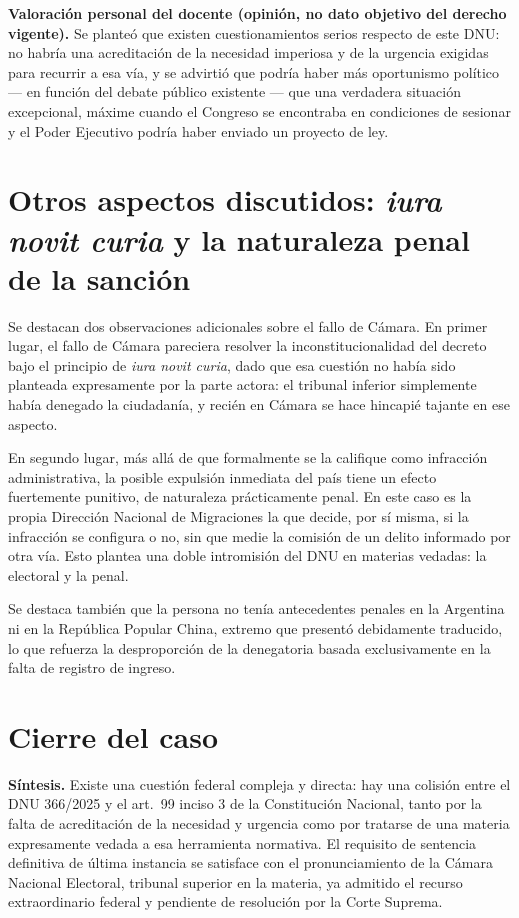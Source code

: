 \documentclass[12pt,oneside]{book}
\begin{document}
\begin{note}
\textbf{Valoración personal del docente (opinión, no dato objetivo del derecho vigente).} Se planteó que existen cuestionamientos serios respecto de este DNU: no habría una acreditación de la necesidad imperiosa y de la urgencia exigidas para recurrir a esa vía, y se advirtió que podría haber más oportunismo político --- en función del debate público existente --- que una verdadera situación excepcional, máxime cuando el Congreso se encontraba en condiciones de sesionar y el Poder Ejecutivo podría haber enviado un proyecto de ley.
\end{note}

\section{Otros aspectos discutidos: \textit{iura novit curia} y la naturaleza penal de la sanción}

Se destacan dos observaciones adicionales sobre el fallo de Cámara. En primer lugar, el fallo de Cámara pareciera resolver la inconstitucionalidad del decreto bajo el principio de \textit{iura novit curia}, dado que esa cuestión no había sido planteada expresamente por la parte actora: el tribunal inferior simplemente había denegado la ciudadanía, y recién en Cámara se hace hincapié tajante en ese aspecto.

En segundo lugar, más allá de que formalmente se la califique como infracción administrativa, la posible expulsión inmediata del país tiene un efecto fuertemente punitivo, de naturaleza prácticamente penal. En este caso es la propia Dirección Nacional de Migraciones la que decide, por sí misma, si la infracción se configura o no, sin que medie la comisión de un delito informado por otra vía. Esto plantea una doble intromisión del DNU en materias vedadas: la electoral y la penal.

Se destaca también que la persona no tenía antecedentes penales en la Argentina ni en la República Popular China, extremo que presentó debidamente traducido, lo que refuerza la desproporción de la denegatoria basada exclusivamente en la falta de registro de ingreso.

\section{Cierre del caso}

\begin{important}
\textbf{Síntesis.} Existe una cuestión federal compleja y directa: hay una colisión entre el DNU 366/2025 y el art.\ 99 inciso 3 de la Constitución Nacional, tanto por la falta de acreditación de la necesidad y urgencia como por tratarse de una materia expresamente vedada a esa herramienta normativa. El requisito de sentencia definitiva de última instancia se satisface con el pronunciamiento de la Cámara Nacional Electoral, tribunal superior en la materia, ya admitido el recurso extraordinario federal y pendiente de resolución por la Corte Suprema.
\end{important}
\end{document}
